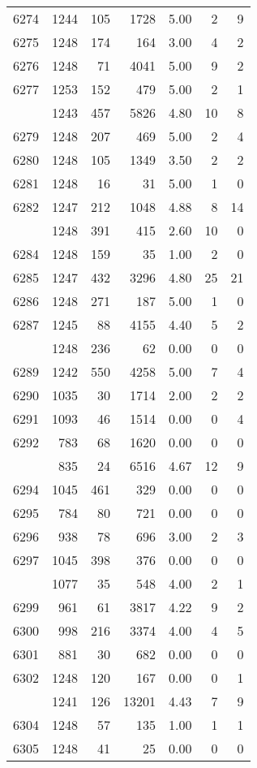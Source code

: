 \documentclass[
]{article}
\begin{document}
\begin{table}
\begin{tabular}[t]{lrrrrrr}
6274 & 1244 & 105 & 1728 & 5.00 & 2 & 9\\
6275 & 1248 & 174 & 164 & 3.00 & 4 & 2\\
6276 & 1248 & 71 & 4041 & 5.00 & 9 & 2\\
6277 & 1253 & 152 & 479 & 5.00 & 2 & 1\\
\addlinespace
6278 & 1243 & 457 & 5826 & 4.80 & 10 & 8\\
6279 & 1248 & 207 & 469 & 5.00 & 2 & 4\\
6280 & 1248 & 105 & 1349 & 3.50 & 2 & 2\\
6281 & 1248 & 16 & 31 & 5.00 & 1 & 0\\
6282 & 1247 & 212 & 1048 & 4.88 & 8 & 14\\
\addlinespace
6283 & 1248 & 391 & 415 & 2.60 & 10 & 0\\
6284 & 1248 & 159 & 35 & 1.00 & 2 & 0\\
6285 & 1247 & 432 & 3296 & 4.80 & 25 & 21\\
6286 & 1248 & 271 & 187 & 5.00 & 1 & 0\\
6287 & 1245 & 88 & 4155 & 4.40 & 5 & 2\\
\addlinespace
6288 & 1248 & 236 & 62 & 0.00 & 0 & 0\\
6289 & 1242 & 550 & 4258 & 5.00 & 7 & 4\\
6290 & 1035 & 30 & 1714 & 2.00 & 2 & 2\\
6291 & 1093 & 46 & 1514 & 0.00 & 0 & 4\\
6292 & 783 & 68 & 1620 & 0.00 & 0 & 0\\
\addlinespace
6293 & 835 & 24 & 6516 & 4.67 & 12 & 9\\
6294 & 1045 & 461 & 329 & 0.00 & 0 & 0\\
6295 & 784 & 80 & 721 & 0.00 & 0 & 0\\
6296 & 938 & 78 & 696 & 3.00 & 2 & 3\\
6297 & 1045 & 398 & 376 & 0.00 & 0 & 0\\
\addlinespace
6298 & 1077 & 35 & 548 & 4.00 & 2 & 1\\
6299 & 961 & 61 & 3817 & 4.22 & 9 & 2\\
6300 & 998 & 216 & 3374 & 4.00 & 4 & 5\\
6301 & 881 & 30 & 682 & 0.00 & 0 & 0\\
6302 & 1248 & 120 & 167 & 0.00 & 0 & 1\\
\addlinespace
6303 & 1241 & 126 & 13201 & 4.43 & 7 & 9\\
6304 & 1248 & 57 & 135 & 1.00 & 1 & 1\\
6305 & 1248 & 41 & 25 & 0.00 & 0 & 0\\

\end{tabular}
\end{table}
\end{document}
